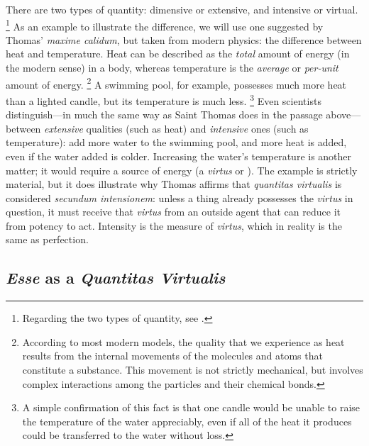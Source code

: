 There are two types of quantity: dimensive or extensive, and intensive or virtual.%
%
\footnote{Regarding the two types of quantity, see \cite[53]{villagrasa:resolutio}.}
%
As an example to illustrate the difference, we will use one suggested by Thomas' \emph{maxime calidum}, but taken from modern physics: the difference between heat and temperature. Heat can be described as the \emph{total} amount of energy (in the modern sense) in a body, whereas temperature is the \emph{average} or \emph{per-unit} amount of energy.%
%
\footnote{According to most modern models, the quality that we experience as heat results from the internal movements of the molecules and atoms that constitute a substance. This movement is not strictly mechanical, but involves complex interactions among the particles and their chemical bonds.} A swimming pool, for example, possesses much more heat than a lighted candle, but its temperature is much less.%
%
\footnote{A simple confirmation of this fact is that one candle would be unable to raise the temperature of the water appreciably, even if all of the heat it produces could be transferred to the water without loss.} Even scientists distinguish---in much the same way as Saint Thomas does in the passage above---between \emph{extensive} qualities (such as heat) and \emph{intensive} ones (such as temperature): add more water to the swimming pool, and more heat is added, even if the water added is colder. Increasing the water's temperature is another matter; it would require a source of energy (a \emph{virtus} or ). The example is strictly material, but it does illustrate why Thomas affirms that \emph{quantitas virtualis} is considered \emph{secundum intensionem}: unless a thing already possesses the \emph{virtus} in question, it must receive that \emph{virtus} from an outside agent that can reduce it from potency to act. Intensity is the measure of \emph{virtus}, which in reality is the same as perfection.

\subsection{\emph{Esse} as a \emph{Quantitas Virtualis}}

